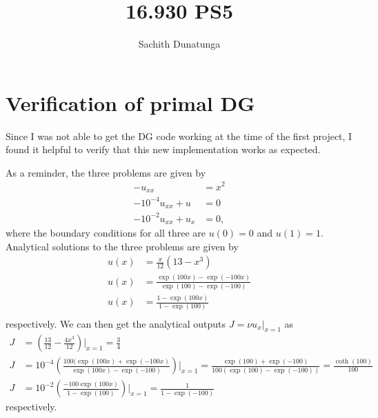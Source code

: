 \documentclass{article}
\begin{document}
\author{Sachith Dunatunga}
\title{16.930 PS5}
\maketitle

\section{Verification of primal DG}

Since I was not able to get the DG code working at the time of the first project, I found it helpful to verify that this new implementation works as expected.

As a reminder, the three problems are given by
\begin{align}
-u_{xx} &= x^2 \\
-10^{-4} u_{xx} + u &= 0 \\
-10^{-2} u_{xx} + u_x &= 0,
\end{align}
where the boundary conditions for all three are $u(0) = 0$ and $u(1) = 1$.
Analytical solutions to the three problems are given by
\begin{align}
u(x) &= \frac{x}{12} \left( 13 - x^3 \right) \\
u(x) &= \frac{\exp(100x) - \exp(-100x)}{\exp(100) - \exp(-100)} \\
u(x) &= \frac{1 - \exp(100x)}{1 - \exp(100)}\\
\end{align}
respectively.
We can then get the analytical outputs $J = \nu u_x \rvert_{x=1}$ as
\begin{align}
J &= \left(\frac{13}{12} - \frac{4x^3}{12} \right) \biggr\rvert_{x=1} = \frac{3}{4} \\
J &= 10^{-4} \left( \frac{100 (\exp(100x) + \exp(-100x)}{\exp(100x) - \exp(-100)}\right) \biggr\rvert_{x=1} = \frac{\exp(100) + \exp(-100)}{100 (\exp(100) - \exp(-100))} = \frac{\coth(100)}{100} \\
J &= 10^{-2} \left( \frac{-100 \exp(100x)}{1 - \exp(100)}\right) \biggr\rvert_{x=1} = \frac{1}{1 - \exp(-100)}
\end{align}
respectively.

\section{}
\end{document}
